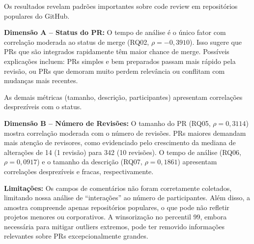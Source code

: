 Os resultados revelam padrões importantes sobre code review em repositórios
populares do GitHub.

\textbf{Dimensão A -- Status do PR:}
O tempo de análise é o único fator com correlação moderada ao status de merge
(RQ02, $\rho = -0,3910$). Isso sugere que PRs que são integrados rapidamente
têm maior chance de merge. Possíveis explicações incluem: PRs simples e bem
preparados passam mais rápido pela revisão, ou PRs que demoram muito perdem
relevância ou conflitam com mudanças mais recentes.

As demais métricas (tamanho, descrição, participantes) apresentam correlações
desprezíveis com o status.

\textbf{Dimensão B -- Número de Revisões:}
O tamanho do PR (RQ05, $\rho = 0,3114$) mostra correlação moderada com o
número de revisões. PRs maiores demandam mais atenção de revisores, como
evidenciado pelo crescimento da mediana de alterações de 14 (1 revisão)
para 342 (10 revisões). O tempo de análise (RQ06, $\rho = 0,0917$) e
o tamanho da descrição (RQ07, $\rho = 0,1861$) apresentam correlações
desprezíveis e fracas, respectivamente.

\textbf{Limitações:}
Os campos de comentários não foram corretamente coletados, limitando nossa
análise de ``interações'' ao número de participantes. Além disso, a amostra
compreende apenas repositórios populares, o que pode não refletir projetos
menores ou corporativos. A winsorização no percentil 99, embora necessária
para mitigar outliers extremos, pode ter removido informações relevantes
sobre PRs excepcionalmente grandes.
